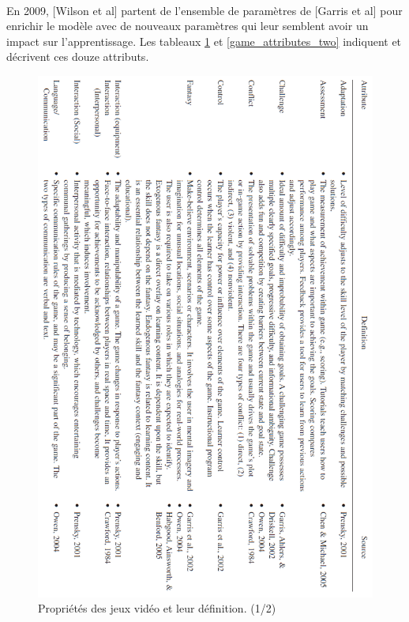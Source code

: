 \paragraph{}En 2009, [Wilson et al]\cite{Wils09} partent de l'ensemble de paramètres de [Garris et al] pour enrichir le modèle avec de nouveaux paramètres qui leur semblent avoir un impact sur l'apprentissage.
Les tableaux \ref{game_attributes_one} et \ref{game_attributes_two} indiquent et décrivent ces douze attributs.

\begin{figure}[htbp]
	\centering
	\includegraphics[width=\linewidth, height=\textheight ]{images/game_attributes_one}
	\caption{Propriétés des jeux vidéo et leur définition. (1/2) \cite{Wils09}}
	\label{game_attributes_one}
\end{figure}
